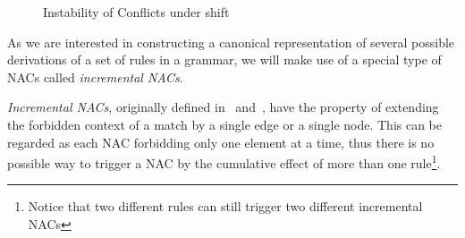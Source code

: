 \begin{example}\label{ex:process:instability}

\begin{figure}[!ht]
  \centering
  \caption{Instability of Conflicts under shift\\}\label{fig:process:instability}
\end{figure}

\end{example}

As we are interested in constructing a canonical representation of several possible derivations of a set of rules in a grammar, we will make use of a special type of NACs called \emph{incremental NACs}.

\emph{Incremental NACs}, originally defined in~\cite{Corradini2013} and~\cite{Corradini2014}, have the property of extending the forbidden context of a match by a single edge or a single node. This can be regarded as each NAC forbidding only one element at a time, thus there is no possible way to trigger a NAC by the cumulative effect of more than one rule\footnote{Notice that two different rules can still trigger two different incremental NACs}. 


